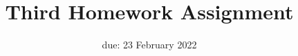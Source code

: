 \renewcommand{\hwnum}{3}

\title{Third Homework Assignment}
\date{due: 23 February 2022}
\maketitle



\nextprob{\todo{}}
\collab{\todo{}}
